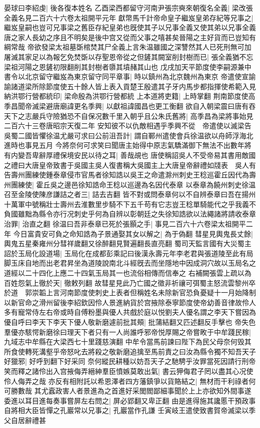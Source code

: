 晏球曰李紹虔|{
	後各復本姓名}
乙酉梁西都留守河南尹張宗奭來朝復名全義|{
	梁改張全義名見二百六十六卷太祖開平元年}
獻幣馬千計帝命皇子繼岌皇弟存紀等兄事之|{
	繼岌皇嗣也豈可兄事梁之舊臣存紀皇弟也旣使其子以兄事全義又使其弟以兄事全義唐之家人長幼之序且不明矣是後中宫又從而父事之嘻甚矣晉陽之主好貨而已豈知有綱常哉}
帝欲發梁太祖墓斲棺焚其尸全義上言朱温雖國之深讐然其人已死刑無可加屠滅其家足以為報乞免焚斲以存聖恩帝從之但鏟其闕室削封樹而已|{
	張全義猶不忘梁祖河陽之恩鏟初限翻削其封樹者隳其墳赭其山也}
戊戌加天平節度使李嗣源兼中書令以北京留守繼岌為東京留守同平章事|{
	時以鎮州為北京魏州為東京}
帝遣使宣諭諭諸道梁所除節度使五十餘人皆上表入貢楚王殷遣其子牙内馬步都指揮使希範入見納洪鄂行營都統印|{
	梁命殷為洪鄂行營都統}
上本道將吏籍|{
	上時掌翻}
荆南節度使高季昌聞帝滅梁避唐廟諱更名季興|{
	以獻祖諱國昌也更工衡翻}
欲自入朝梁震曰唐有吞天下之志嚴兵守險猶恐不自保况數千里入朝乎且公朱氏舊將|{
	高季昌為梁將事始見二百六十三卷唐昭宗天復二年}
安知彼不以仇敵相遇乎季興不從　帝遣使以滅梁告吳蜀二國皆懼徐温尤嚴可求曰公前沮吾計|{
	謂自鄆州遣使會兵徐温欲以舟師浮海北進時也事見五月}
今將奈何可求笑曰聞唐主始得中原志氣驕滿御下無法不出數年將有内變吾卑辭厚禮保境安民以待之耳|{
	善哉覘也}
唐使稱詔吳人不受帝易其書用敵國之禮曰大唐皇帝致書于吳國主吳人復書稱大吳國主上大唐皇帝辭禮如牋表　吳人有告壽州團練使鍾泰章侵市官馬者徐知誥以吳王之命遣滁州刺史王稔巡霍丘因代為壽州團練使|{
	霍丘吳之邊邑徐知誥命王稔以巡邊為名因代泰章}
以泰章為饒州刺史徐温召至金陵使陳彦謙詰之者三|{
	詰去吉翻}
皆不對或問泰章何以不自辨泰章曰吾在揚州十萬軍中號稱壯士壽州去淮數里步騎不下五千苟有它志豈王稔單騎能代之乎我義不負國雖黜為縣令亦行况刺史乎何為自辨以彰朝廷之失徐知誥欲以法繩諸將請收泰章治罪|{
	治直之翻}
徐温曰吾非泰章已死於張顥之手|{
	事見二百六十六卷梁太祖開平二年}
今日富貴安可負之命知誥為子景通娶其女以解之|{
	為于偽翻}
彗星見輿鬼長丈餘|{
	輿鬼五星秦雍州分彗祥歲翻又徐醉翻見賢遍翻長直亮翻}
蜀司天監言國有大災蜀主詔於玉局化設道場|{
	玉局化在成都彭乘記曰後漢永壽元年李老君與張道陵至此有局脚玉床自地而出老君昇坐為道陵說南北斗經旣去而坐隱地中因成洞穴故以玉局名之道經以二十四化上應二十四氣玉局其一也流俗相傳而信奉之}
右補闕張雲上疏以為百姓怨氣上徹於天|{
	徹敕列翻}
故彗星見此乃亡國之徵非祈禳可弭蜀主怒流雲黎州卒於道　郭崇韜上言河南節度使刺史上表者但稱姓名未除新官恐負憂疑十一月始降制以新官命之滑州留後李紹欽因伶人景進納貨於宫掖除泰寧節度使帝幼善音律故伶人多有寵常侍左右帝或時自傅粉墨與優人共戲於庭以悦劉夫人優名謂之李天下嘗因為優自呼曰李天下李天下優人敬新磨遽前批其頰|{
	批蒲結翻又匹述翻反手擊也}
帝失色羣優亦駭愕新磨徐曰理天下者只有一人尚誰呼邪帝悦厚賜之帝嘗畋于中牟踐民稼|{
	九域志中牟縣在大梁西七十里踐慈演翻}
中牟令當馬前諫曰陛下為民父母奈何毁其所食使轉死溝壑乎帝怒叱去將殺之敬新磨追擒至馬前責之曰汝為縣令獨不知吾天子好獵邪|{
	好呼到翻下好采同}
奈何縱民耕種以妨吾天子之馳騁乎汝罪當死因請行刑帝笑而釋之諸伶出入宫掖侮弄縉紳羣臣憤嫉莫敢出氣|{
	書云狎侮君子罔以盡其心况使伶人侮弄之哉}
亦反有相附託以希恩澤者四方藩鎮爭以貨賂結之|{
	無材而干利祿者何可勝數哉}
其尤蠧政害人者景進為之首進好采閭閻鄙細事聞於上上亦欲知外間事遂委進以耳目進每奏事嘗屏左右問之|{
	屏必郢翻又卑正翻}
由是進得施其讒慝干預政事自將相大臣皆憚之孔巖常以兄事之|{
	孔巖當作孔謙}
壬寅岐王遣使致書賀帝滅梁以季父自居辭禮甚

